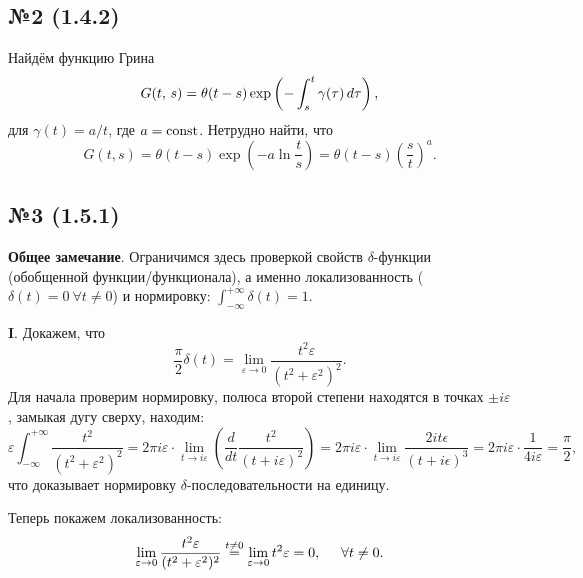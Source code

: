 \subsection*{№2 (1.4.2)}


Найдём функцию Грина
\begin{equation*}
    G(t,\,  s) = \theta(t-s) \exp\left(
        - \int_{s}^{t} \gamma(\tau) \, d \tau
    \right),
\end{equation*}
для $\gamma(t) = a/t$, где $a = \textnormal{const}$.  Нетрудно найти, что
\begin{equation*}
    G(t, s) = \theta(t-s) \exp\left(
        - a \ln \frac{t}{s}
    \right) = \theta(t-s) \left(\frac{s}{t}\right)^a.
\end{equation*}




\subsection*{№3 (1.5.1)}


\textbf{Общее замечание}. Ограничимся здесь проверкой свойств $\delta$-функции (обобщенной функции/функционала), а именно локализованность ($\delta(t) = 0 \ \forall  t \neq 0$) и нормировку: $\int_{-\infty}^{+\infty}  \delta(t) = 1$.

\textbf{I}. Докажем, что
\begin{equation*}
     \frac{\pi}{2} \delta(t) = \lim_{\varepsilon \to 0} \frac{t^2 \varepsilon}{(t^2 + \varepsilon^2)^2}.
\end{equation*}
Для начала проверим нормировку, полюса второй степени находятся в точках $\pm i \varepsilon$, замыкая дугу сверху, находим:
\begin{equation*}
    \varepsilon \int_{-\infty}^{+\infty} \frac{t^2}{(t^2 + \varepsilon^2)^2} = 
    2 \pi i \varepsilon \cdot \lim_{t \to i \varepsilon} \left(
        \frac{d }{d t}  \frac{t^2}{(t + i \varepsilon)^2}   
    \right) = 2 \pi i \varepsilon \cdot \lim_{t \to i \varepsilon}  \frac{2 i t \epsilon }{(t+i \epsilon )^3} = 
     2 \pi i \varepsilon \cdot \frac{1}{4 i \varepsilon} = \frac{\pi}{2},
\end{equation*}
что доказывает нормировку $\delta$-последовательности на единицу. 

Теперь покажем локализованность:
\begin{equation*}
    \lim_{\varepsilon \to 0} \frac{t^2 \varepsilon}{(t^2 + \varepsilon^2)^2} \overset{t \neq 0}{=} \lim_{\varepsilon \to 0} t^2 \varepsilon = 0,
    \hspace{5 mm}  \forall t \neq 0.
\end{equation*}


